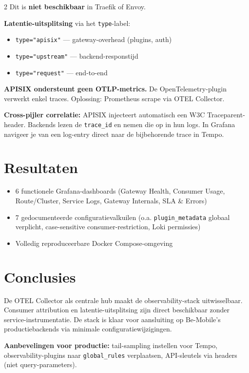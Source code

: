 \documentclass[a0,portrait]{hogent-poster}
\begin{document}
\begin{multicols}{2}
Dit is \textbf{niet beschikbaar} in Traefik of Envoy.

\textbf{Latentie-uitsplitsing} via het \texttt{type}-label:
\begin{itemize}
  \item \texttt{type="apisix"} --- gateway-overhead (plugins, auth)
  \item \texttt{type="upstream"} --- backend-responstijd
  \item \texttt{type="request"} --- end-to-end
\end{itemize}

\textbf{APISIX ondersteunt geen OTLP-metrics.} De OpenTelemetry-plugin verwerkt enkel traces. Oplossing: Prometheus scrape via OTEL Collector.

\textbf{Cross-pijler correlatie:} APISIX injecteert automatisch een W3C Traceparent-header. Backends lezen de \texttt{trace\_id} en nemen die op in hun logs. In Grafana navigeer je van een log-entry direct naar de bijbehorende trace in Tempo.

\section{Resultaten}

\begin{itemize}
  \item 6 functionele Grafana-dashboards (Gateway Health, Consumer Usage, Route/Cluster, Service Logs, Gateway Internals, SLA \& Errors)
  \item 7 gedocumenteerde configuratievalkuilen (o.a. \texttt{plugin\_metadata} globaal verplicht, case-sensitive consumer-restriction, Loki permissies)
  \item Volledig reproduceerbare Docker Compose-omgeving
\end{itemize}

\section{Conclusies}

De OTEL Collector als centrale hub maakt de observability-stack uitwisselbaar. Consumer attribution en latentie-uitsplitsing zijn direct beschikbaar zonder service-instrumentatie. De stack is klaar voor aansluiting op Be-Mobile's productiebackends via minimale configuratiewijzigingen.

\textbf{Aanbevelingen voor productie:} tail-sampling instellen voor Tempo, observability-plugins naar \texttt{global\_rules} verplaatsen, API-sleutels via headers (niet query-parameters).

\end{multicols}
\end{document}
